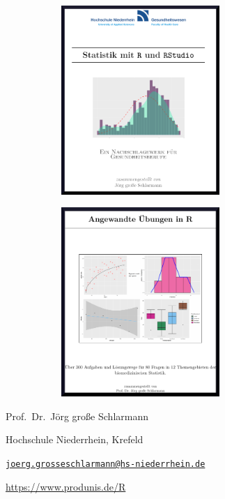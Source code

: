 \documentclass[
  11pt,
  a4paperpaper,
]{scrreprt}
\begin{document}
\begin{figure}

\begin{minipage}{0.50\linewidth}

\begin{figure}[H]

{\centering \includegraphics[width=60mm,height=\textheight]{images/RBuch.png}

}


\end{figure}%

\end{minipage}%
%
\begin{minipage}{0.50\linewidth}

\begin{figure}[H]

{\centering \includegraphics[width=60mm,height=\textheight]{images/AngewandteUebungen.png}

}


\end{figure}%

\end{minipage}%

\end{figure}%

\vfill

Prof.~Dr.~Jörg große Schlarmann

Hochschule Niederrhein, Krefeld

\href{mailto:joerg.grosseschlarmann@hs-niederrhein.de}{\nolinkurl{joerg.grosseschlarmann@hs-niederrhein.de}}

\url{https://www.produnis.de/R}
\end{document}
